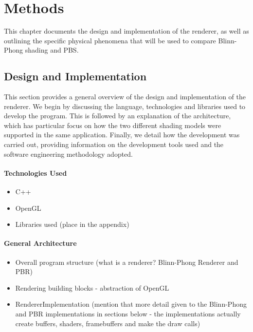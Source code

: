 \chapter{Methods}
\label{chapter2}

This chapter documents the design and implementation of the renderer, as well as outlining the specific physical phenomena that will be used to compare Blinn-Phong shading and PBS.

\section{Design and Implementation}

This section provides a general overview of the design and implementation of the renderer. We begin by discussing the language, technologies and libraries used to develop the program. This is followed by an explanation of the architecture, which has particular focus on how the two different shading models were supported in the same application. Finally, we detail how the development was carried out, providing information on the development tools used and the software engineering methodology adopted.

\subsubsection{Technologies Used}

\begin{itemize}
	\item C++
	\item OpenGL
	\item Libraries used (place in the appendix)
\end{itemize}

\subsubsection{General Architecture}

\begin{itemize}
	\item Overall program structure (what is a renderer? Blinn-Phong Renderer and PBR)
	\item Rendering building blocks - abstraction of OpenGL
	\item RendererImplementation (mention that more detail given to the Blinn-Phong and PBR implementations in sections below - the implementations actually create buffers, shaders, framebuffers and make the draw calls)
\end{itemize}

